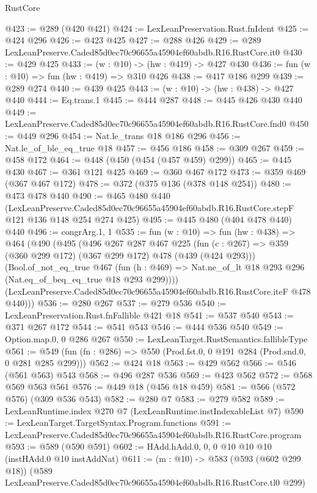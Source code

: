 \begin{lexlean}{RustCore}
\begin{coremodule}
@423 := @289 (@420 @421)
@424 := LexLeanPreservation.Rust.fnIdent
@425 := @424 @296
@426 := @423 @425
@427 := @288 @426
@429 := @289 LexLeanPreserve.Caded85d0ec70c96655a45904ef60abdb.R16.RustCore.it0
@430 := @429 @425
@433 := (w : @10) -> (hw : @419) -> @427 @430
@436 := fun (w : @10) => fun (hw : @419) => @310 @426
@438 := @417 @186 @299
@439 := @289 @274
@440 := @439 @425
@443 := (w : @10) -> (hw : @438) -> @427 @440
@444 := Eq.trans.{1}
@445 := @444 @287
@448 := @445 @426 @430 @440
@449 := LexLeanPreserve.Caded85d0ec70c96655a45904ef60abdb.R16.RustCore.fnd0
@450 := @449 @296
@454 := Nat.le_trans @18 @186 @296
@456 := Nat.le_of_ble_eq_true @18
@457 := @456 @186
@458 := @309 @267
@459 := @458 @172
@464 := @448 (@450 (@454 (@457 @459) @299))
@465 := @445 @430
@467 := @361 @121 @425
@469 := @360 @467 @172
@473 := @359 @469 (@367 @467 @172)
@478 := @372 (@375 @136 (@378 @148 @254))
@480 := @473 @478 @440
@490 := @465
    @480
    @440
    (LexLeanPreserve.Caded85d0ec70c96655a45904ef60abdb.R16.RustCore.stepF
      @121
      @136
      @148
      @254
      @274
      @425)
@495 := @445 @480 (@404 @478 @440) @440
@496 := congrArg.{1, 1}
@535 := fun (w : @10) =>
  fun (hw : @438) =>
  @464
    (@490
      (@495
        (@496
          @267
          @287
          @467
          @225
          (fun (c : @267) => @359 (@360 @299 @172) (@367 @299 @172) @478 (@439 (@424 @293)))
          (Bool.of_not_eq_true
            @467
            (fun (h : @469) => Nat.ne_of_lt @18 @293 @296 (Nat.eq_of_beq_eq_true @18 @293 @299))))
        (LexLeanPreserve.Caded85d0ec70c96655a45904ef60abdb.R16.RustCore.iteF @478 @440)))
@536 := @280 @267
@537 := @279 @536
@540 := LexLeanPreservation.Rust.fnFallible @421 @18
@541 := @537 @540
@543 := @371 @267 @172
@544 := @541 @543
@546 := @444 @536 @540
@549 := Option.map.{0, 0} @286 @267
@550 := LexLeanTarget.RustSemantics.fallibleType
@561 := @549 (fun (fn : @286) => @550 (Prod.fst.{0, 0} @191 @284 (Prod.snd.{0, 0} @281 @285 @299)))
@562 := @424 @18
@563 := @429 @562
@566 := @546 (@561 @563) @543
@568 := @496 @287 @536
@569 := @423 @562
@572 := @568 @569 @563 @561
@576 := @449 @18 (@456 @18 @459)
@581 := @566 (@572 @576) (@309 @536 @543)
@582 := @280 @7
@583 := @279 @582
@589 := LexLeanRuntime.index @270 @7 (LexLeanRuntime.instIndexableList @7)
@590 := LexLeanTarget.TargetSyntax.Program.functions
@591 := LexLeanPreserve.Caded85d0ec70c96655a45904ef60abdb.R16.RustCore.program
@593 := @589 (@590 @591)
@602 := HAdd.hAdd.{0, 0, 0} @10 @10 @10 (instHAdd.{0} @10 instAddNat)
@611 := (m : @10) ->
  @583
    (@593 (@602 @299 @18))
    (@589 LexLeanPreserve.Caded85d0ec70c96655a45904ef60abdb.R16.RustCore.tl0 @299)

\end{coremodule}
\end{lexlean}
